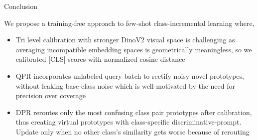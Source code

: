 \documentclass[aspectratio=169,10pt]{beamer}
\begin{document}


\begin{frame}{Conclusion}

        We propose a training-free approach to few-shot class-incremental learning where,
        \vspace{0.7em}
        \begin{itemize}
            \setlength{\itemsep}{1pt}
            \item Tri level calibration with stronger DinoV2 visual space is challenging as averaging incompatible embedding spaces is geometrically meaningless, so we calibrated [CLS] scores with normalized cosine distance
            \vspace{1em}
            \item QPR incorporates unlabeled query batch to rectify noisy novel prototypes, without leaking base-class noise which is well-motivated by the need for precision over coverage
            \vspace{1em}
            \item DPR reroutes only the most confusing class pair prototypes after calibration, thus creating virtual prototypes with class-specific discriminative-prompt. Update only when no other class's similarity gets worse because of rerouting
        \end{itemize}

\end{frame}
\end{document}
